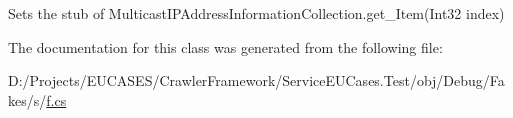 Sets the stub of Multicast\-I\-P\-Address\-Information\-Collection.\-get\-\_\-\-Item(\-Int32 index)



The documentation for this class was generated from the following file\-:\begin{DoxyCompactItemize}
\item 
D\-:/\-Projects/\-E\-U\-C\-A\-S\-E\-S/\-Crawler\-Framework/\-Service\-E\-U\-Cases.\-Test/obj/\-Debug/\-Fakes/s/\hyperlink{s_2f_8cs}{f.\-cs}\end{DoxyCompactItemize}

